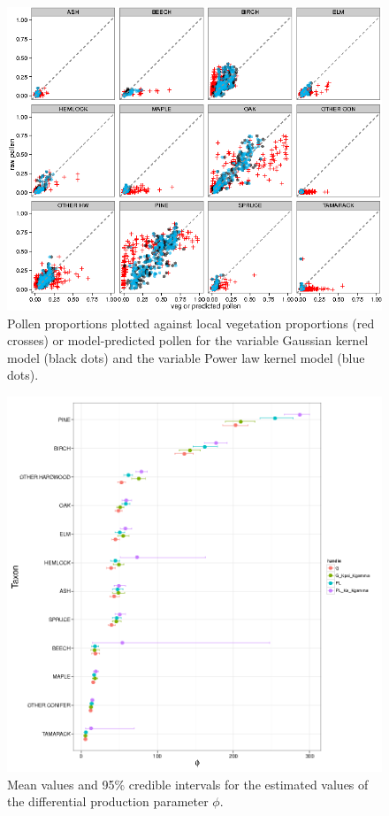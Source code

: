 \begin{figure}
\centering
\includegraphics[width=7in]{figures/pollen_preds_flexible.png}
\caption{Pollen proportions plotted against local vegetation
  proportions (red crosses) or model-predicted pollen for the variable
  Gaussian kernel model (black dots) and the variable Power law kernel
  model (blue dots).}
\label{fig:preds}
\end{figure}

\begin{figure}
\centering
\includegraphics[width=7in]{figures/phi.png}
\caption{Mean values and 95\% credible intervals for the estimated
  values of the differential production parameter $\phi$.}
\label{fig:phi}
\end{figure}


